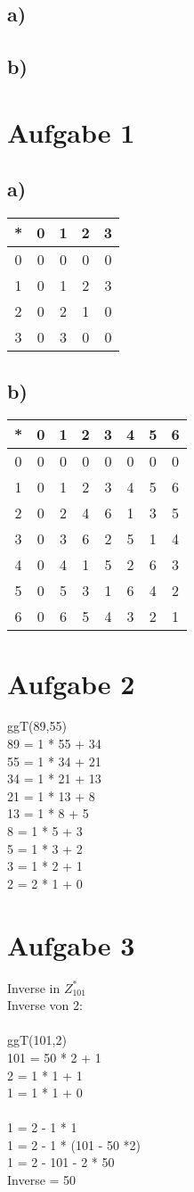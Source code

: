 \documentclass{article}
\begin{document}
	\subsection*{a)}
	
	\subsection*{b)}
	
	\section*{Aufgabe 1}
	\subsection*{a)}
	\begin{tabular}[h]{c|cccc}
	*&0&1&2&3 \\
	\hline
	0&0&0&0&0 \\
	1&0&1&2&3 \\
	2&0&2&1&0 \\
	3&0&3&0&0 \\
\end{tabular}
	\subsection*{b)}
	\begin{tabular}[h]{c|ccccccc}
		*&0&1&2&3&4&5&6 \\
		\hline
		0&0&0&0&0&0&0&0 \\
		1&0&1&2&3&4&5&6 \\
		2&0&2&4&6&1&3&5 \\
		3&0&3&6&2&5&1&4 \\
		4&0&4&1&5&2&6&3 \\
		5&0&5&3&1&6&4&2 \\
		6&0&6&5&4&3&2&1 \\
	\end{tabular}
	\section*{Aufgabe 2}
	ggT(89,55) \\
	89 = 1 * 55 + 34 \\
	55 = 1 * 34 + 21 \\
	34 = 1 * 21 + 13 \\
	21 = 1 * 13 + 8 \\
	13 = 1 * 8 + 5 \\
	8 = 1 * 5 + 3 \\
	5 = 1 * 3 + 2 \\
	3 = 1 * 2 + 1 \\
	2 = 2 * 1 + 0
	\section*{Aufgabe 3}
	Inverse in $Z_{101}^*$ \\
	Inverse von 2: \\ \\
	ggT(101,2) \\
	101 = 50 * 2 + 1 \\
	2 = 1 * 1 + 1 \\
	1 = 1 * 1 + 0 \\ \\
	1 = 2 - 1 * 1 \\
	1 = 2 - 1 * (101 - 50 *2) \\
	1 = 2 - 101 - 2 * 50 \\
	Inverse = 50 \\ \\
	
\end{document}
